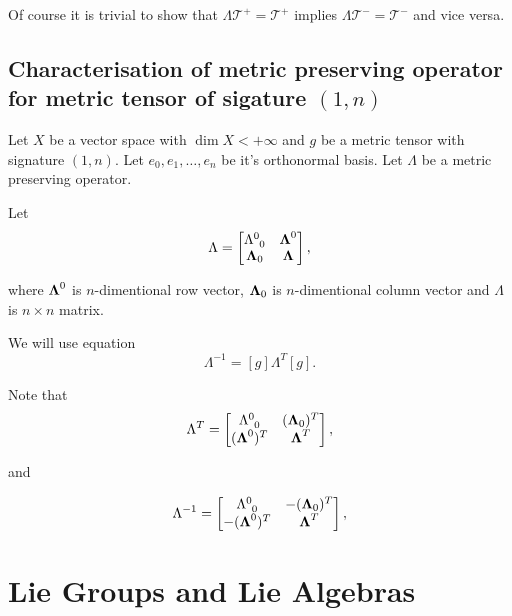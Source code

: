 \documentclass[main.tex]{subfiles}
\begin{document}
Of course it is trivial to show that $\Lambda \mathcal{T}^{+} = \mathcal{T}^{+}$ implies $\Lambda \mathcal{T}^{-} = \mathcal{T}^{-}$ and vice versa.

\subsection{Characterisation of metric preserving operator for metric tensor of sigature $(1,n)$}

Let $X$ be a vector space with $\dim X < +\infty$ and $g$ be a metric tensor with signature $(1, n)$. Let $e_0, e_1, \dots, e_n$ be it's orthonormal basis. Let $\Lambda$ be a metric preserving operator.

Let 
\begin{equation}
\Lambda = 
\begin{bmatrix}
    \tensor{\Lambda}{^0_0} &  \bs{\Lambda}^0 \\
    \bs{\Lambda}_0 & \bs{\Lambda} \\
\end{bmatrix},
\end{equation}

where $\boldsymbol{\Lambda}^0$ is $n$-dimentional row vector, $\boldsymbol{\Lambda}_0$ is $n$-dimentional column vector and $\Lambda$ is $n\times n$ matrix.

We will use equation
\begin{equation}
\Lambda^{-1} = [g]\Lambda^T[g].
\end{equation}

Note that
\begin{equation}
\Lambda^T = 
\begin{bmatrix}
    \tensor{\Lambda}{^0_0} &  (\bs{\Lambda}_0)^T \\
    (\bs{\Lambda}^0)^T & \bs{\Lambda}^T \\
\end{bmatrix},
\end{equation}

and

\begin{equation}
\Lambda^{-1} = 
\begin{bmatrix}
    \tensor{\Lambda}{^0_0} &  -(\bs{\Lambda}_0)^T \\
    -(\bs{\Lambda}^0)^T & \bs{\Lambda}^T \\
\end{bmatrix},
\end{equation}


\section{Lie Groups and Lie Algebras}
\end{document}
